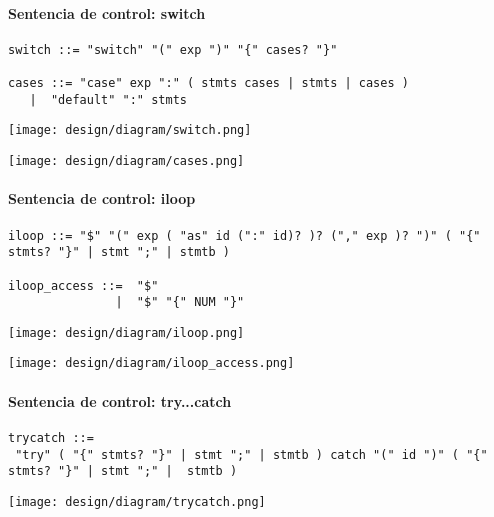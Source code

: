 \paragraph{Sentencia de control: switch}
\begin{lstlisting}[style=nonumbers]
switch ::= "switch" "(" exp ")" "{" cases? "}"

cases ::= "case" exp ":" ( stmts cases | stmts | cases )
   |  "default" ":" stmts
\end{lstlisting}  	
\begin{center}
\texttt{[image: design/diagram/switch.png]} 
\end{center}
\begin{center}
\texttt{[image: design/diagram/cases.png]} 
\end{center}

\paragraph{Sentencia de control: iloop}
\begin{lstlisting}[style=nonumbers,basicstyle=\tiny]
iloop ::= "$" "(" exp ( "as" id (":" id)? )? ("," exp )? ")" ( "{" stmts? "}" | stmt ";" | stmtb )

iloop_access ::=  "$"
               |  "$" "{" NUM "}"
\end{lstlisting}  	
\begin{center}
\texttt{[image: design/diagram/iloop.png]} 
\end{center}
\begin{center}
\texttt{[image: design/diagram/iloop\_access.png]} 
\end{center}

\paragraph{Sentencia de control: try...catch}

\begin{lstlisting}[style=nonumbers,basicstyle=\tiny]
trycatch ::= 
 "try" ( "{" stmts? "}" | stmt ";" | stmtb ) catch "(" id ")" ( "{" stmts? "}" | stmt ";" |  stmtb )
\end{lstlisting}  	
\begin{center}
\texttt{[image: design/diagram/trycatch.png]} 
\end{center}

